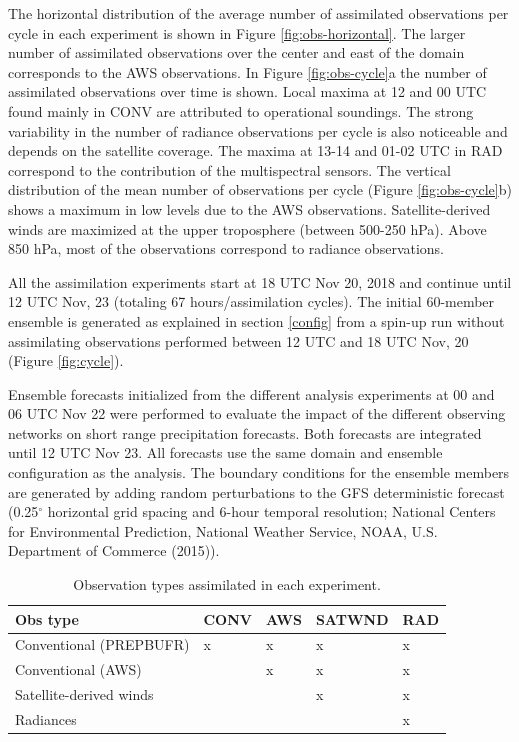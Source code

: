 \documentclass[final,5p,times,twocolumn,authoryear]{elsarticle} %
\begin{document}
The horizontal distribution of the average number of assimilated observations per cycle in each experiment is shown in Figure \ref{fig:obs-horizontal}. The larger number of assimilated observations over the center and east of the domain corresponds to the AWS observations. In Figure \ref{fig:obs-cycle}a the number of assimilated observations over time is shown. Local maxima at 12 and 00 UTC found mainly in CONV are attributed to operational soundings. The strong variability in the number of radiance observations per cycle is also noticeable and depends on the satellite coverage. The maxima at 13-14 and 01-02 UTC in RAD correspond to the contribution of the multispectral sensors. The vertical distribution of the mean number of observations per cycle (Figure \ref{fig:obs-cycle}b) shows a maximum in low levels due to the AWS observations. Satellite-derived winds are maximized at the upper troposphere (between 500-250 hPa). Above 850 hPa, most of the observations correspond to radiance observations.

All the assimilation experiments start at 18 UTC Nov 20, 2018 and continue until 12 UTC Nov, 23 (totaling 67 hours/assimilation cycles). The initial 60-member ensemble is generated as explained in section \ref{config} from a spin-up run without assimilating observations performed between 12 UTC and 18 UTC Nov, 20 (Figure \ref{fig:cycle}).

Ensemble forecasts initialized from the different analysis experiments at 00 and 06 UTC Nov 22 were performed to evaluate the impact of the different observing networks on short range precipitation forecasts. Both forecasts are integrated until 12 UTC Nov 23. All forecasts use the same domain and ensemble configuration as the analysis. The boundary conditions for the ensemble members are generated by adding random perturbations to the GFS deterministic forecast (0.25\(^{\circ}\) horizontal grid spacing and 6-hour temporal resolution; National Centers for Environmental Prediction, National Weather Service, NOAA, U.S. Department of Commerce (2015)).

\begin{table}

\caption{\label{tab:table-exp}Observation types assimilated in each experiment.}
\centering
\begin{tabu} to 
\toprule
Obs type & CONV & AWS & SATWND & RAD\\
\midrule
Conventional (PREPBUFR) & x & x & x & x\\
Conventional (AWS) &  & x & x & x\\
Satellite-derived winds &  &  & x & x\\
Radiances &  &  &  & x\\
\bottomrule
\end{tabu}
\end{table}
\end{document}
